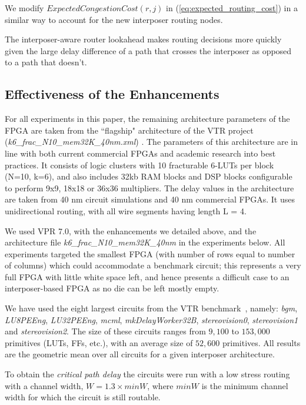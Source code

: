 \documentclass[journal]{IEEEtran}
\begin{document}
We modify $ExpectedCongestionCost(r,j)$ in (\ref{eq:expected_routing_cost}) in a similar way to account for the new interposer routing nodes. 

The interposer-aware router lookahead makes routing decisions more quickly given the large delay difference of a path that crosses the interposer as opposed to a path that doesn't.

\subsection{Effectiveness of the Enhancements}
\label{sec:CADeffect}
For all experiments in this paper, the remaining architecture parameters of the FPGA are taken from the ``flagship" architecture of the VTR project (\textit{k6\_frac\_N10\_mem32K\_40nm.xml}) \cite{luu2014vtr}. The parameters of this architecture are in line with both current commercial FPGAs and academic research into best practices. It consists of logic clusters with 10 fracturable 6-LUTs per block (N=10, k=6), and also includes 32kb RAM blocks and DSP blocks configurable to perform 9x9, 18x18 or 36x36 multipliers. The delay values in the architecture are taken from 40 nm circuit simulations and 40 nm commercial FPGAs. It uses unidirectional routing, with all wire segments having length L = 4.

We used VPR 7.0, with the enhancements we detailed above, and the architecture file \textit{k6\_frac\_N10\_mem32K\_40nm} in the experiments below. All experiments targeted the smallest FPGA (with number of rows equal to number of columns) which could accommodate a benchmark circuit; this represents a very full FPGA with little white space left, and hence presents a difficult case to an interposer-based FPGA as no die can be left mostly empty. 

We have used the eight largest circuits from the VTR benchmark~\cite{vtr2012}, namely: \textit{bgm}, \textit{LU8PEEng}, \textit{LU32PEEng}, \textit{mcml}, \textit{mkDelayWorker32B}, \textit{stereovision0}, \textit{stereovision1} and \textit{stereovision2}. The size of these circuits ranges from $9,100$ to $153,000$ primitives (LUTs, FFs, etc.), with an average size of $52,600$ primitives. All results are the geometric mean over all circuits for a given interposer architecture.

To obtain the \textit{critical path delay} the circuits were run with a low stress routing with a channel width, $W = 1.3 \times minW$, where $minW$ is the minimum channel width for which the circuit is still routable. 
\end{document}

